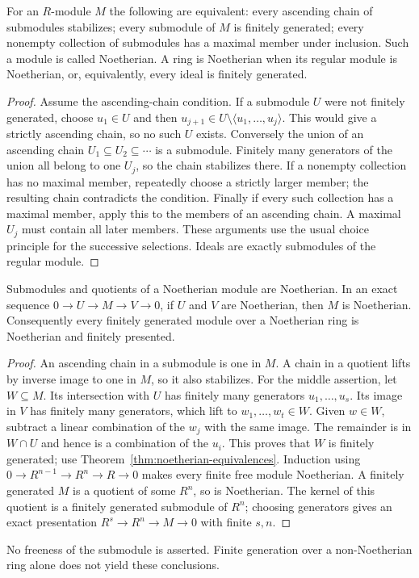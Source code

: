 \begin{theorem}\label{thm:noetherian-equivalences}
For an $R$-module $M$ the following are equivalent:
every ascending chain of submodules stabilizes; every submodule of $M$
is finitely generated; every nonempty collection of submodules has a
maximal member under inclusion. Such a module is called Noetherian.
A ring is Noetherian when its regular module is Noetherian, or,
equivalently, every ideal is finitely generated.
\end{theorem}
\begin{proof}
Assume the ascending-chain condition. If a submodule $U$ were not
finitely generated, choose $u_1\in U$ and then
$u_{j+1}\in U\setminus\langle u_1,\ldots,u_j\rangle$.
This would give a strictly ascending chain, so no such $U$ exists.
Conversely the union of an ascending chain $U_1\subseteq U_2\subseteq\cdots$
is a submodule. Finitely many generators of the union all belong to
one $U_j$, so the chain stabilizes there. If a nonempty collection has
no maximal member, repeatedly choose a strictly larger member; the
resulting chain contradicts the condition. Finally if every such
collection has a maximal member, apply this to the members of an
ascending chain. A maximal $U_j$ must contain all later members.
These arguments use the usual choice principle for the successive
selections. Ideals are exactly submodules of the regular module.
\end{proof}

\begin{proposition}\label{prop:noetherian-modules}
Submodules and quotients of a Noetherian module are Noetherian.
In an exact sequence $0\to U\to M\to V\to0$, if $U$ and $V$ are
Noetherian, then $M$ is Noetherian. Consequently every finitely generated
module over a Noetherian ring is Noetherian and finitely presented.
\end{proposition}
\begin{proof}
An ascending chain in a submodule is one in $M$. A chain in a quotient
lifts by inverse image to one in $M$, so it also stabilizes.
For the middle assertion, let $W\subseteq M$. Its intersection with
$U$ has finitely many generators $u_1,\ldots,u_s$. Its image in $V$
has finitely many generators, which lift to $w_1,\ldots,w_t\in W$.
Given $w\in W$, subtract a linear combination of the $w_j$ with the
same image. The remainder is in $W\cap U$ and hence is a combination
of the $u_i$. This proves that $W$ is finitely generated; use
Theorem~\ref{thm:noetherian-equivalences}.
Induction using $0\to R^{n-1}\to R^n\to R\to0$ makes every finite free
module Noetherian. A finitely generated $M$ is a quotient of some $R^n$,
so is Noetherian. The kernel of this quotient is a finitely generated
submodule of $R^n$; choosing generators gives an exact presentation
$R^s\to R^n\to M\to0$ with finite $s,n$.
\end{proof}
No freeness of the submodule is asserted. Finite generation over a
non-Noetherian ring alone does not yield these conclusions.

